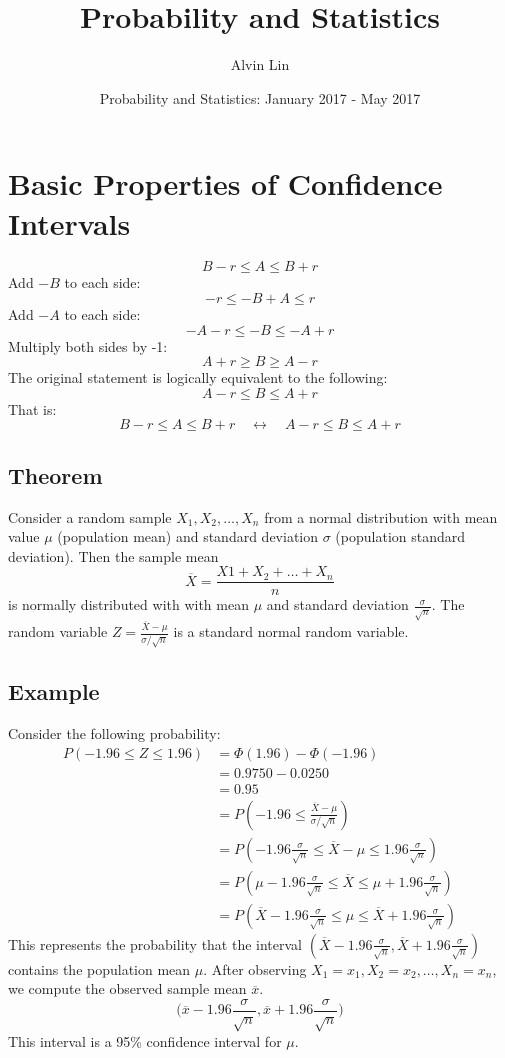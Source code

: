 \documentclass{math}
\title{Probability and Statistics}
\author{Alvin Lin}
\date{Probability and Statistics: January 2017 - May 2017}
\begin{document}
\maketitle

\section*{Basic Properties of Confidence Intervals}
\[ B-r\leq A\leq B+r \]
Add \( -B \) to each side:
\[ -r\leq -B+A\leq r \]
Add \( -A \) to each side:
\[ -A-r\leq -B\leq -A+r \]
Multiply both sides by -1:
\[ A+r\geq B\geq A-r \]
The original statement is logically equivalent to the following:
\[ A-r\leq B\leq A+r \]
That is:
\[ B-r\leq A\leq B+r \quad\leftrightarrow\quad A-r\leq B\leq A+r \]

\subsection*{Theorem}
Consider a random sample \( X_{1},X_{2},\dots,X_{n} \) from a normal
distribution with mean value \( \mu \) (population mean) and standard deviation
\( \sigma \) (population standard deviation). Then the sample mean
\[ \overline{X} = \frac{X{1}+X_{2}+\dots+X_{n}}{n} \]
is normally distributed with with mean \( \mu \) and standard deviation
\( \frac{\sigma}{\sqrt{n}} \). The random variable
\( Z = \frac{\overline{X}-\mu}{\sigma/\sqrt{n}} \) is a standard normal random
variable. \par

\subsection*{Example}
Consider the following probability:
\begin{align*}
  P(-1.96\leq Z\leq 1.96) &= \Phi(1.96)-\Phi(-1.96) \\
  &= 0.9750-0.0250 \\
  &= 0.95 \\
  &= P(-1.96\leq\frac{\overline{X}-\mu}{\sigma/\sqrt{n}}) \\
  &= P(-1.96\frac{\sigma}{\sqrt{n}}\leq
    \overline{X}-\mu\leq1.96\frac{\sigma}{\sqrt{n}}) \\
  &= P(\mu-1.96\frac{\sigma}{\sqrt{n}}\leq\overline{X}
    \leq\mu+1.96\frac{\sigma}{\sqrt{n}}) \\
  &= P(\overline{X}-1.96\frac{\sigma}{\sqrt{n}}\leq\mu
    \leq\overline{X}+1.96\frac{\sigma}{\sqrt{n}})
\end{align*}
This represents the probability that the interval \( (\overline{X}
-1.96\frac{\sigma}{\sqrt{n}},\overline{X}+1.96\frac{\sigma}{\sqrt{n}}) \)
contains the population mean \( \mu \). After observing
\( X_{1}=x_{1},X_{2}=x_{2},\dots,X_{n}=x_{n} \), we compute the
observed sample mean \( \overline{x} \).
\[ \bigg(\overline{x}-1.96\frac{\sigma}{\sqrt{n}},
   \overline{x}+1.96\frac{\sigma}{\sqrt{n}}\bigg) \]
This interval is a 95\% confidence interval for \( \mu \).
\end{document}
